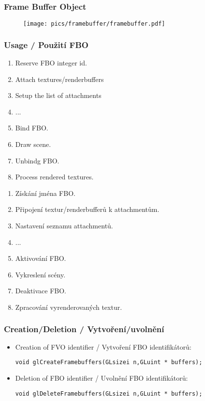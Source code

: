 \begin{frame}\frametitle{Frame Buffer Object}
  \begin{figure}[h]
  \texttt{[image: pics/framebuffer/framebuffer.pdf]}
  \end{figure}
\end{frame}


\begin{frame}\frametitle{Usage / Použití FBO}\scriptsize
\begin{enumerate}
  \item Reserve FBO integer id.
  \item Attach textures/renderbuffers
  \item Setup the list of attachments
  \item ...
  \item Bind FBO.
  \item Draw scene.
  \item Unbindg FBO.
  \item Process rendered textures.
\end{enumerate}

\begin{enumerate}
  \item{Získání jména FBO.}
  \item{Připojení textur/renderbufferů k attachmentům.}
  \item{Nastavení seznamu attachmentů.}
  \item{...}
  \item{Aktivování FBO.}
  \item{Vykreslení scény.}
  \item{Deaktivace FBO.}
  \item{Zpracování vyrenderovaných textur.}
\end{enumerate}
\end{frame}

\begin{frame}[fragile]\frametitle{Creation/Deletion / Vytvoření/uvolnění}
  \begin{itemize}
    \item{
    Creation of FVO identifier / Vytvoření FBO identifikátorů:
{\scriptsize
\begin{verbatim}
void glCreateFramebuffers(GLsizei n,GLuint * buffers);
\end{verbatim}
}}
    \item{
    Deletion of FBO identifier / Uvolnění FBO identifikátorů:
{\scriptsize
\begin{verbatim}
void glDeleteFramebuffers(GLsizei n,GLuint * buffers);
\end{verbatim}
}}
  \end{itemize}
\end{frame}

